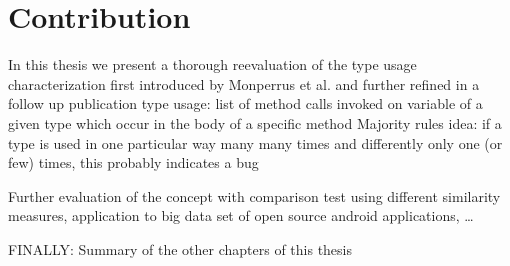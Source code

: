 \section{Contribution}

In this thesis we present a thorough reevaluation of the type usage characterization first introduced by Monperrus et al.\cite{monperrus2010detecting} and further refined in a follow up publication \cite{monperrus2013detecting}
type usage: list of method calls invoked on variable of a given type which occur in the body of a specific method
Majority rules idea: if a type is used in one particular way many many times and differently only one (or few) times, this probably indicates a bug

Further evaluation of the concept with comparison test using different similarity measures, application to big data set of open source android applications, \ldots

FINALLY: Summary of the other chapters of this thesis
